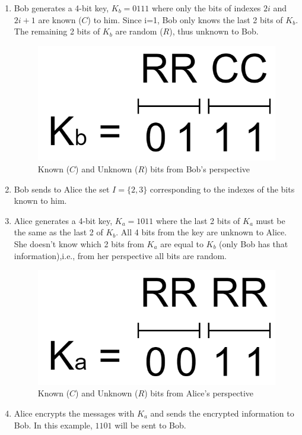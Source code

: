 \begin{enumerate}
\item Bob generates a 4-bit key, $K_b=0111$ where only the bits of indexes $2i$ and $2i+1$ are known ($C$) to him. Since i=1, Bob only knows the last 2 bits of $K_b$. The remaining 2 bits of $K_b$ are random ($R$), thus unknown to Bob.
\renewcommand{\figurename}{Figure}
\begin{figure}[H]
\centering
\includegraphics[width=.25\linewidth]{./figures/mpc/mpc_bob_key}
\caption{Known ($C$) and Unknown ($R$) bits from Bob's perspective }
\label{fig:knownbob}
\end{figure}
\item Bob sends to Alice the set $I = \{2,3\}$ corresponding to the indexes of the bits known to him.
\item Alice generates a 4-bit key, $K_a=1011$ where the last 2 bits of $K_a$ must be the same as the last 2 of $K_b$. All 4 bits from the key
are unknown to Alice. She doesn't know which 2 bits from $K_a$ are equal to $K_b$ (only Bob has that information),i.e., from her perspective
all bits are random.
\renewcommand{\figurename}{Figure}
\begin{figure}[H]
\centering
\includegraphics[width=.25\linewidth]{./figures/mpc/mpc_alice_key}
\caption{Known ($C$) and Unknown ($R$) bits from Alice's perspective }
\label{fig:knownalice}
\end{figure}
\item Alice encrypts the messages with $K_a$ and sends the encrypted information to Bob. In this example, $1101$ will be sent to Bob.
\renewcommand{\figurename}{Figure}
\begin{figure}[H]

\end{figure}
\end{enumerate}
